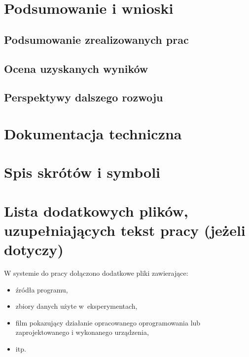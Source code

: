 \documentclass[a4paper,twoside,12pt]{book}
\begin{document}
\chapter{Podsumowanie i wnioski}
\section{Podsumowanie zrealizowanych prac}
\section{Ocena uzyskanych wyników}
\section{Perspektywy dalszego rozwoju}

\backmatter

\cleardoublepage
{}
\printbibliography

\begin{appendices}

\chapter{Dokumentacja techniczna}

\chapter{Spis skrótów i symboli}

\chapter{Lista dodatkowych plików, uzupełniających tekst pracy (jeżeli dotyczy)} 

W systemie do pracy dołączono dodatkowe pliki zawierające:
\begin{itemize}
\item źródła programu,
\item zbiory danych użyte w~eksperymentach,
\item film pokazujący działanie opracowanego oprogramowania lub zaprojektowanego i wykonanego urządzenia,
\item itp.
\end{itemize}

\listoffigures
{}
\listoftables
{}

\end{appendices}
\end{document}
